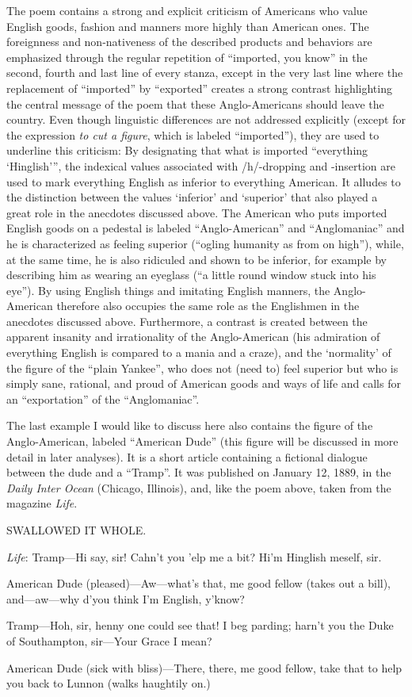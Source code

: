 The poem contains a strong and explicit criticism of Americans who value English goods, fashion and manners more highly than American ones. The foreignness and non-nativeness of the described products and behaviors are emphasized through the regular repetition of “imported, you know” in the second, fourth and last line of every stanza, except in the very last line where the replacement of “imported” by “exported” creates a strong contrast highlighting the central message of the poem that these Anglo-Americans should leave the country. Even though linguistic differences are not addressed explicitly (except for the expression \emph{to cut a figure}, which is labeled “imported”), they are used to underline this criticism: By designating that what is imported “everything ‘Hinglish’”, the indexical values associated with /h/-dropping and -insertion are used to mark everything English as inferior to everything American. It alludes to the distinction between the values ‘inferior’ and ‘superior’ that also played a great role in the anecdotes discussed above. The American who puts imported English goods on a pedestal is labeled “Anglo-American” and “Anglomaniac” and he is characterized as feeling superior (“ogling humanity as from on high”), while, at the same time, he is also ridiculed and shown to be inferior, for example by describing him as wearing an eyeglass (“a little round window stuck into his eye”). By using English things and imitating English manners, the Anglo-American therefore also occupies the same role as the Englishmen in the anecdotes discussed above. Furthermore, a contrast is created between the apparent insanity and irrationality of the Anglo-American (his admiration of everything English is compared to a mania and a craze), and the ‘normality’ of the figure of the “plain Yankee”, who does not (need to) feel superior but who is simply sane, rational, and proud of American goods and ways of life and calls for an “exportation” of the “Anglomaniac”.


The last example I would like to discuss here also contains the figure of the Anglo-American, labeled “American Dude” (this figure will be discussed in more detail in later analyses). It is a short article containing a fictional dialogue between the dude and a “Tramp”. It was published on January 12, 1889, in the \emph{Daily Inter Ocean} (Chicago, Illinois), and, like the poem above, taken from the magazine \emph{Life}.

\begin{ipquote}
\begin{center}
SWALLOWED IT WHOLE.
\end{center}
\textit{Life}: Tramp—Hi say, sir! Cahn’t you ’elp me a bit? Hi’m Hinglish meself, sir.

American Dude (pleased)—Aw—what’s that, me good fellow (takes out a bill), and—aw—why d’you think I’m English, y’know?

Tramp—Hoh, sir, henny one could see that! I beg parding; harn’t you the Duke of Southampton, sir—Your Grace I mean?

American Dude (sick with bliss)—There, there, me good fellow, take that to help you back to Lunnon (walks haughtily on.)
\end{ipquote}


